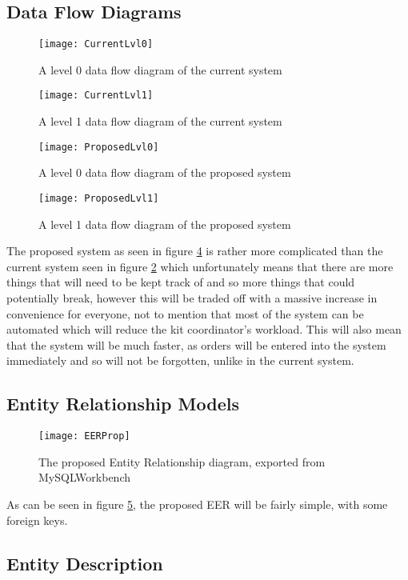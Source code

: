 \documentclass[
11pt, %
a4paper, %
oneside, %
headinclude,footinclude, %
BCOR5mm, %
]{scrartcl}
\begin{document}
\subsection{Data Flow Diagrams}
\begin{figure}[H]
	\centering
	\texttt{[image: CurrentLvl0]}
	\caption{A level 0 data flow diagram of the current system}
	\label{CurrentLvl0}
\end{figure}
\begin{figure}[H]
	\centering
	\texttt{[image: CurrentLvl1]}
	\caption{A level 1 data flow diagram of the current system}
	\label{CurrentLvl1}
\end{figure}
\begin{figure}[H]
	\centering
	\texttt{[image: ProposedLvl0]}
	\caption{A level 0 data flow diagram of the proposed system}
	\label{ProposedLvl0}
\end{figure}
\begin{figure}[H]
	\centering
	\texttt{[image: ProposedLvl1]}
	\caption{A level 1 data flow diagram of the proposed system}
	\label{ProposedLvl1}
\end{figure}
The proposed system as seen in figure \ref{ProposedLvl1} is rather more complicated than the current system seen in figure \ref{CurrentLvl1} which unfortunately means that there are more things that will need to be kept track of and so more things that could potentially break, however this will be traded off with a massive increase in convenience for everyone, not to mention that most of the system can be automated which will reduce the kit coordinator's workload. This will also mean that the system will be much faster, as orders will be entered into the system immediately and so will not be forgotten, unlike in the current system.

\subsection{Entity Relationship Models}

\begin{figure}[H]
	\centering\texttt{[image: EERProp]}
	\caption{The proposed Entity Relationship diagram, exported from MySQLWorkbench}
	\label{PropEER}	
\end{figure}
As can be seen in figure \ref{PropEER}, the proposed EER will be fairly simple, with some foreign keys.

\subsection{Entity Description}
\end{document}
